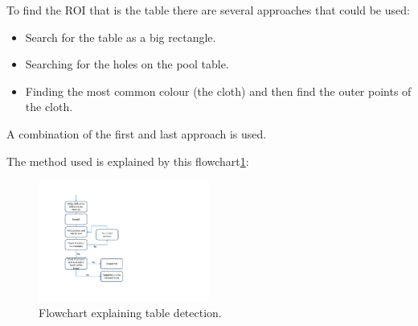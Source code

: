 To find the ROI that is the table there are several approaches that could be used:
\begin{itemize}
	\item Search for the table as a big rectangle.
	\item Searching for the holes on the pool table.
	\item Finding the most common colour (the cloth) and then find the outer points of the cloth.
\end{itemize}

A combination of the first and last approach is used.

The method used is explained by this flowchart\ref{fig:detecttable_flowchart}:

\begin{figure}[H]
\begin{center}
\leavevmode
\includegraphics[width=0.5\textwidth]{images/tabledetect_flowchat.pdf}
\end{center}
\caption{Flowchart explaining table detection.}
\label{fig:detecttable_flowchart}
\end{figure}

